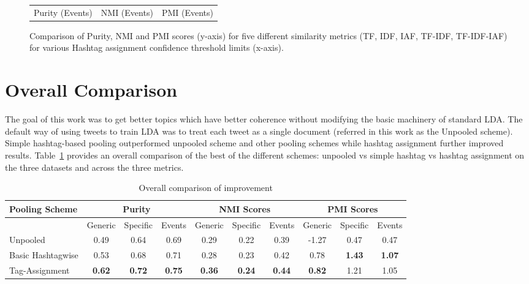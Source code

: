 \documentclass[10pt,a5paper,twoside]{article}
\begin{document}
\begin{figure}[t!]
\begin{center}
{\begin{tabular}{ccc}
		

		{\LARGE Purity (Events)} & {\LARGE NMI (Events)} & 
		{\LARGE PMI (Events)}\\

	
	\end{tabular}
}
\end{center}
\vspace{-4mm}
\caption{\footnotesize Comparison of Purity, NMI and PMI scores
  (y-axis) for five different similarity metrics (TF, IDF, IAF,
  TF-IDF, TF-IDF-IAF) for various Hashtag assignment confidence
  threshold limits (x-axis).} \label{fig-1}
\end{figure}

\section{Overall Comparison}

\label{sec:overall}

The goal of this work was to get better topics which have better
coherence without modifying the basic machinery of standard LDA. The
default way of using tweets to train LDA was to treat each tweet as a
single document (referred in this work as the Unpooled scheme). Simple
hashtag-based pooling outperformed unpooled scheme and other pooling
schemes while hashtag assignment further improved
results. Table~\ref{tbl-10} provides an overall comparison of the best
of the different schemes: unpooled vs simple hashtag vs hashtag
assignment on the three datasets and across the three metrics.

\begin{table}[!h]
\centering
\resizebox{14cm}{!} 
{
	\begin{tabular}{|l|ccc|ccc|ccc|}
	\hline
	Pooling Scheme  & \multicolumn {3}{c}{Purity} & \multicolumn {3}{c}{NMI Scores} & \multicolumn {3}{c|}{PMI Scores}\\
	\hline
	 & Generic & Specific & Events &  Generic & Specific & Events &  Generic & Specific & Events\\
	\hline
	Unpooled & 0.49 & 0.64 & 0.69 & 0.29 & 0.22 & 0.39 & -1.27 & 0.47 & 0.47 \\
	\hline
	Basic Hashtagwise & 0.53 & 0.68 & 0.71 & 0.28 & 0.23 & 0.42 & 0.78 & \textbf{1.43} & \textbf{1.07} \\
	\hline
	Tag-Assignment & \textbf{0.62} & \textbf{0.72} & \textbf{0.75} & \textbf{0.36} & \textbf{0.24} & \textbf{0.44} & \textbf{0.82} & 1.21 & 1.05 \\
	\hline
	\end{tabular}
}
\caption{Overall comparison of improvement}\label{tbl-10}
\end{table}
\end{document}

